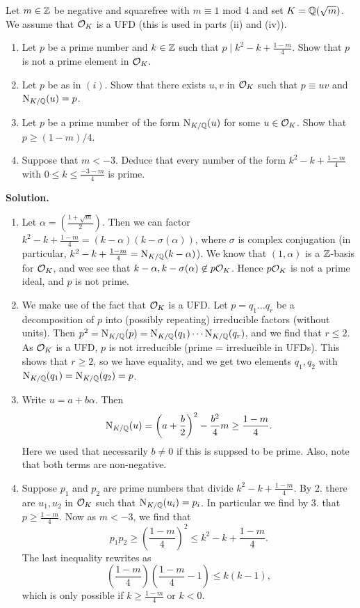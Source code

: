 \documentclass[a4paper,11pt]{article}
\begin{document}
Let $m \in \mathbb{Z}$ be negative and squarefree with $m \equiv 1$ mod $4$ and
set $K = \mathbb{Q}(\sqrt m)$. We assume that $\mathcal{O}_K$ is a UFD (this is 
used in parts (ii) and (iv)).
\begin{enumerate}
\item Let $p$ be a prime number and $k \in \mathbb{Z}$ such that 
    $p \mid k^2 - k + \frac{1-m}4$. Show that $p$ is not a 
    prime element in $\mathcal{O}_K$.
\item Let $p$ be as in $(i)$. Show that there exists $u,v$ in $\mathcal{O}_K$
    such that $p \equiv uv$ and $\operatorname{N}_{K/\mathbb{Q}}(u) = p$. 
\item Let $p$ be a prime number of the form $\operatorname{N}_{K/\mathbb{Q}}(u)$ 
    for some $u \in \mathcal{O}_K$. Show that $p \geq (1-m)/4$. 
\item Suppose that $m < -3$. Deduce that every number of the form
    $k^2 - k + \frac{1-m}4$ with $0 \leq k \leq \frac{-3-m}4$ is prime.
\end{enumerate}
\textbf{Solution.}
\begin{enumerate}[labelindent=0pt, wide]
    \item Let $\alpha = \left(\frac{1+\sqrt m}2\right)$. Then we can factor
        $k^2 - k + \frac{1-m}4 = (k - \alpha)(k - \sigma(\alpha))$, where $\sigma$ is
        complex conjugation (in particular, 
        $k^2-k+\frac{1-m}4 = \operatorname{N}_{K/\mathbb{Q}}(k-\alpha)$). We know that $(1,\alpha)$ is
        a $\mathbb{Z}$-basis for $\mathcal{O}_K$, and wee see that $k-\alpha, k-\sigma(\alpha)
        \not \in p\mathcal{O}_K$. Hence $p\mathcal{O}_K$ is not a prime ideal, and $p$ is
        not prime.
    \item We make use of the fact that $\mathcal{O}_K$ is a UFD. Let $p = q_1 \dots q_r$ be 
        a decomposition of $p$ into (possibly repeating) irreducible factors
        (without units).
        Then $p^2 = \operatorname{N}_{K/\mathbb{Q}}(p) = \operatorname{N}_{K/\mathbb{Q}}(q_1) \cdots \allowbreak \operatorname{N}_{K/\mathbb{Q}}(q_r)$,
        and we find that
        $r \leq 2$. As $\mathcal{O}_K$ is a UFD, $p$ is not irreducible (prime =
        irreducible in UFDs). This shows that $r \geq 2$, so we
        have equality, and we get two elements $q_1, q_2$ with $\operatorname{N}_{K/\mathbb{Q}}(q_1) = 
        \operatorname{N}_{K/\mathbb{Q}}(q_2) = p$. 
    \item Write $u = a + b \alpha$. Then 
        \begin{equation*}
            \operatorname{N}_{K/\mathbb{Q}}(u) = \left( a + \frac b2\right)^2 - \frac{b^2}4m \geq \frac{1-m}4.
        \end{equation*}
        Here we used that necessarily $b\neq0$ if this is suppsed to be prime. Also,
        note that both terms are non-negative.
    \item Suppose $p_1$ and $p_2$ are prime numbers that divide $k^2 - k + \frac{1-m}4$. 
        By 2. there are $u_1,u_2$ in $\mathcal{O}_K$ such that $\operatorname{N}_{K/\mathbb{Q}}(u_i) = p_i$. In particular
        we find by 3. that $p \geq \frac{1-m}4$. Now as $m < -3$, we find that 
        $$p_1 p_2 \geq \left (\frac{1-m}4 \right)^2 \leq k^2 - k + \frac{1-m}4.$$
        The last inequality rewrites as
        \begin{equation*}
            \left(\frac{1-m}4\right) \left(\frac{1-m}4 - 1 \right) \leq
                k(k-1),
        \end{equation*}
        which is only possible if $k \geq \frac{1-m}4$ or $k < 0$.
\end{enumerate}
\end{document}
